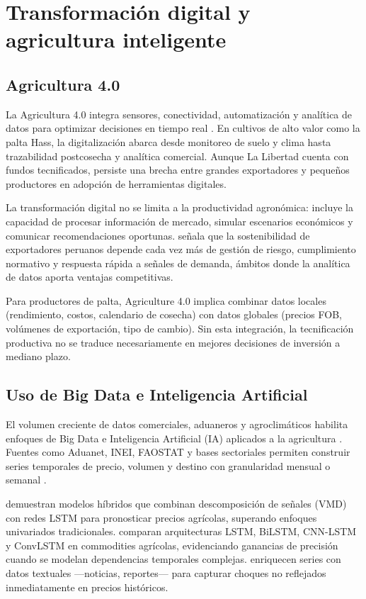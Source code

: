 \section{Transformaci\'on digital y agricultura inteligente}

\subsection{Agricultura 4.0}

La Agricultura 4.0 integra sensores, conectividad, automatizaci\'on y anal\'itica de datos para optimizar decisiones en tiempo real \citep{Chen2023}. En cultivos de alto valor como la palta Hass, la digitalizaci\'on abarca desde monitoreo de suelo y clima hasta trazabilidad postcosecha y anal\'itica comercial. Aunque La Libertad cuenta con fundos tecnificados, persiste una brecha entre grandes exportadores y peque\~nos productores en adopci\'on de herramientas digitales.

La transformaci\'on digital no se limita a la productividad agron\'omica: incluye la capacidad de procesar informaci\'on de mercado, simular escenarios econ\'omicos y comunicar recomendaciones oportunas. \citet{Pantaleon2024} se\~nala que la sostenibilidad de exportadores peruanos depende cada vez m\'as de gesti\'on de riesgo, cumplimiento normativo y respuesta r\'apida a se\~nales de demanda, \'ambitos donde la anal\'itica de datos aporta ventajas competitivas.

Para productores de palta, Agriculture 4.0 implica combinar datos locales (rendimiento, costos, calendario de cosecha) con datos globales (precios FOB, vol\'umenes de exportaci\'on, tipo de cambio). Sin esta integraci\'on, la tecnificaci\'on productiva no se traduce necesariamente en mejores decisiones de inversi\'on a mediano plazo.

\subsection{Uso de Big Data e Inteligencia Artificial}

El volumen creciente de datos comerciales, aduaneros y agroclim\'aticos habilita enfoques de Big Data e Inteligencia Artificial (IA) aplicados a la agricultura \citep{Chen2023, Murugesan2022, ReisFilho2022}. Fuentes como Aduanet, INEI, FAOSTAT y bases sectoriales permiten construir series temporales de precio, volumen y destino con granularidad mensual o semanal \citep{UNDataFAO}.

\citet{Chen2023} demuestran modelos h\'ibridos que combinan descomposici\'on de se\~nales (VMD) con redes LSTM para pronosticar precios agr\'icolas, superando enfoques univariados tradicionales. \citet{Murugesan2022} comparan arquitecturas LSTM, BiLSTM, CNN-LSTM y ConvLSTM en commodities agr\'icolas, evidenciando ganancias de precisi\'on cuando se modelan dependencias temporales complejas. \citet{ReisFilho2022} enriquecen series con datos textuales ---noticias, reportes--- para capturar choques no reflejados inmediatamente en precios hist\'oricos.

